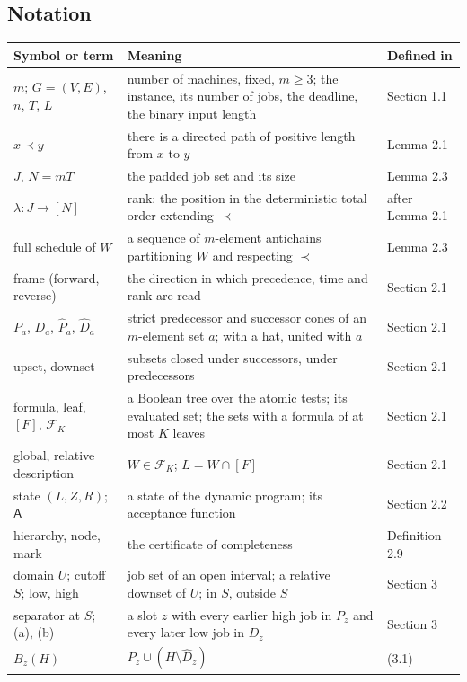 \subsection*{Notation}

\noindent
{\footnotesize
\begin{longtable}{@{}L{4.0cm}L{8.2cm}L{2.5cm}@{}}
\toprule
Symbol or term & Meaning & Defined in \\
\midrule
\endhead
\bottomrule
\endfoot
$m$; $G=(V,E)$, $n$, $T$, $L$ & number of machines, fixed, $m\geq3$; the instance, its number of jobs, the deadline, the binary input length & Section 1.1 \\
$x\prec y$ & there is a directed path of positive length from $x$ to $y$ & Lemma 2.1 \\
$J$, $N=mT$ & the padded job set and its size & Lemma 2.3 \\
$\lambda\colon J\to[N]$ & rank: the position in the deterministic total order extending $\prec$ & after Lemma 2.1 \\
full schedule of $W$ & a sequence of $m$-element antichains partitioning $W$ and respecting $\prec$ & Lemma 2.3 \\
frame (forward, reverse) & the direction in which precedence, time and rank are read & Section 2.1 \\
$P_a$, $D_a$, $\widehat P_a$, $\widehat D_a$ & strict predecessor and successor cones of an $m$-element set $a$; with a hat, united with $a$ & Section 2.1 \\
upset, downset & subsets closed under successors, under predecessors & Section 2.1 \\
formula, leaf, $[F]$, $\mathcal F_K$ & a Boolean tree over the atomic tests; its evaluated set; the sets with a formula of at most $K$ leaves & Section 2.1 \\
global, relative description & $W\in\mathcal F_K$; $L=W\cap[F]$ & Section 2.1 \\
state $(L,Z,R)$; $\mathsf A$ & a state of the dynamic program; its acceptance function & Section 2.2 \\
hierarchy, node, mark & the certificate of completeness & Definition 2.9 \\
domain $U$; cutoff $S$; low, high & job set of an open interval; a relative downset of $U$; in $S$, outside $S$ & Section 3 \\
separator at $S$; (a), (b) & a slot $z$ with every earlier high job in $P_z$ and every later low job in $D_z$ & Section 3 \\
$B_z(H)$ & $P_z\cup(H\setminus\widehat D_z)$ & (3.1) \\

\end{longtable}}
